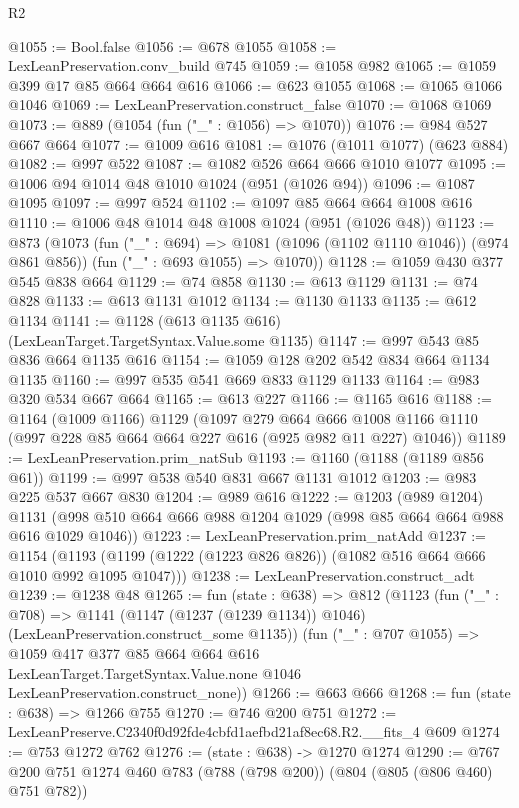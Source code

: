 \begin{lexlean}{R2}
\begin{coremodule}
@1055 := Bool.false
@1056 := @678 @1055
@1058 := LexLeanPreservation.conv_build @745
@1059 := @1058 @982
@1065 := @1059 @399 @17 @85 @664 @664 @616
@1066 := @623 @1055
@1068 := @1065 @1066 @1046
@1069 := LexLeanPreservation.construct_false
@1070 := @1068 @1069
@1073 := @889 (@1054 (fun ("_" : @1056) => @1070))
@1076 := @984 @527 @667 @664
@1077 := @1009 @616
@1081 := @1076 (@1011 @1077) (@623 @884)
@1082 := @997 @522
@1087 := @1082 @526 @664 @666 @1010 @1077
@1095 := @1006 @94 @1014 @48 @1010 @1024 (@951 (@1026 @94))
@1096 := @1087 @1095
@1097 := @997 @524
@1102 := @1097 @85 @664 @664 @1008 @616
@1110 := @1006 @48 @1014 @48 @1008 @1024 (@951 (@1026 @48))
@1123 := @873
    (@1073
      (fun ("_" : @694) => @1081 (@1096 (@1102 @1110 @1046)) (@974 @861 @856))
      (fun ("_" : @693 @1055) => @1070))
@1128 := @1059 @430 @377 @545 @838 @664
@1129 := @74 @858
@1130 := @613 @1129
@1131 := @74 @828
@1133 := @613 @1131 @1012
@1134 := @1130 @1133
@1135 := @612 @1134
@1141 := @1128 (@613 @1135 @616) (LexLeanTarget.TargetSyntax.Value.some @1135)
@1147 := @997 @543 @85 @836 @664 @1135 @616
@1154 := @1059 @128 @202 @542 @834 @664 @1134 @1135
@1160 := @997 @535 @541 @669 @833 @1129 @1133
@1164 := @983 @320 @534 @667 @664
@1165 := @613 @227
@1166 := @1165 @616
@1188 := @1164
    (@1009 @1166)
    @1129
    (@1097
      @279
      @664
      @666
      @1008
      @1166
      @1110
      (@997 @228 @85 @664 @664 @227 @616 (@925 @982 @11 @227) @1046))
@1189 := LexLeanPreservation.prim_natSub
@1193 := @1160 (@1188 (@1189 @856 @61))
@1199 := @997 @538 @540 @831 @667 @1131 @1012
@1203 := @983 @225 @537 @667 @830
@1204 := @989 @616
@1222 := @1203
    (@989 @1204)
    @1131
    (@998 @510 @664 @666 @988 @1204 @1029 (@998 @85 @664 @664 @988 @616 @1029 @1046))
@1223 := LexLeanPreservation.prim_natAdd
@1237 := @1154
    (@1193 (@1199 (@1222 (@1223 @826 @826)) (@1082 @516 @664 @666 @1010 @992 @1095 @1047)))
@1238 := LexLeanPreservation.construct_adt
@1239 := @1238 @48
@1265 := fun (state : @638) =>
  @812
    (@1123
      (fun ("_" : @708) =>
      @1141 (@1147 (@1237 (@1239 @1134)) @1046) (LexLeanPreservation.construct_some @1135))
      (fun ("_" : @707 @1055) =>
      @1059
        @417
        @377
        @85
        @664
        @664
        @616
        LexLeanTarget.TargetSyntax.Value.none
        @1046
        LexLeanPreservation.construct_none))
@1266 := @663 @666
@1268 := fun (state : @638) => @1266 @755
@1270 := @746 @200 @751
@1272 := LexLeanPreserve.C2340f0d92fde4cbfd1aefbd21af8ec68.R2.__fits_4 @609
@1274 := @753 @1272 @762
@1276 := (state : @638) -> @1270 @1274
@1290 := @767 @200 @751 @1274 @460 @783 (@788 (@798 @200)) (@804 (@805 (@806 @460) @751 @782))

\end{coremodule}
\end{lexlean}
